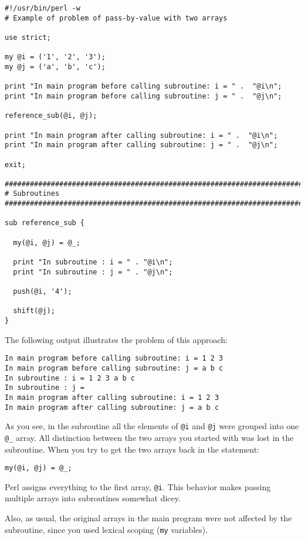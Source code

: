\begin{lstlisting}
#!/usr/bin/perl -w
# Example of problem of pass-by-value with two arrays

use strict;

my @i = ('1', '2', '3');
my @j = ('a', 'b', 'c');

print "In main program before calling subroutine: i = " .  "@i\n";
print "In main program before calling subroutine: j = " .  "@j\n";

reference_sub(@i, @j);

print "In main program after calling subroutine: i = " .  "@i\n";
print "In main program after calling subroutine: j = " .  "@j\n";

exit;

################################################################################
# Subroutines
################################################################################

sub reference_sub {

  my(@i, @j) = @_;

  print "In subroutine : i = " . "@i\n";
  print "In subroutine : j = " . "@j\n";

  push(@i, '4');

  shift(@j);
}
\end{lstlisting}

The following output illustrates the problem of this approach:

\begin{lstlisting}
In main program before calling subroutine: i = 1 2 3
In main program before calling subroutine: j = a b c
In subroutine : i = 1 2 3 a b c
In subroutine : j = 
In main program after calling subroutine: i = 1 2 3
In main program after calling subroutine: j = a b c
\end{lstlisting}

As you see, in the subroutine all the elements of \verb|@i| and \verb|@j| were grouped into one \verb|@_| array. All distinction between the two arrays you started with was lost in the subroutine. When you try to get the two arrays back in the statement:

\begin{lstlisting}
my(@i, @j) = @_;
\end{lstlisting}

Perl assigns everything to the first array, \verb|@i|. This behavior makes passing multiple arrays into subroutines somewhat dicey. 

Also, as usual, the original arrays in the main program were not affected by the subroutine, since you used lexical scoping (\verb|my| variables).

